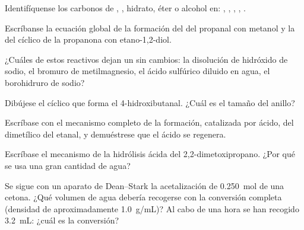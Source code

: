 \begin{exercise}[$\star$]\label{exo:b1:acetals-protection:1}
Identifíquense los carbonos de , , hidrato, éter o
alcohol en:
, , , ,
.
\end{exercise}

\begin{exercise}[$\star$]\label{exo:b1:acetals-protection:2}
Escríbanse la ecuación global de la formación del  del propanal con
metanol y la del  cíclico de la propanona con etano-1,2-diol.
\end{exercise}

\begin{exercise}[$\star$]\label{exo:b1:acetals-protection:3}
¿Cuáles de estos reactivos dejan un  sin cambios: la disolución de
hidróxido de sodio, el bromuro de metilmagnesio, el ácido sulfúrico
diluido en agua, el borohidruro de sodio?
\end{exercise}

\begin{exercise}[$\star$]\label{exo:b1:acetals-protection:4}
Dibújese el  cíclico que forma el 4-hidroxibutanal. ¿Cuál es el
tamaño del anillo?
\end{exercise}

\begin{exercise}[$\star\star$]\label{exo:b1:acetals-protection:5}
Escríbase con  el mecanismo completo de la formación,
catalizada por ácido, del  dimetílico del etanal, y demuéstrese que
el ácido se regenera.
\end{exercise}

\begin{exercise}[$\star\star$]\label{exo:b1:acetals-protection:6}
Escríbase el mecanismo de la hidrólisis ácida del
2,2-dimetoxipropano. ¿Por qué se usa una gran cantidad de agua?
\end{exercise}

\begin{exercise}[$\star\star$]\label{exo:b1:acetals-protection:7}
Se sigue con un aparato de Dean--Stark la acetalización de
\qty{0.250}{mol} de una cetona. ¿Qué volumen de agua debería recogerse con
la conversión completa (densidad de aproximadamente \qty{1.0}{g/mL})? Al
cabo de una hora se han recogido \qty{3.2}{mL}: ¿cuál es la conversión?
\end{exercise}

